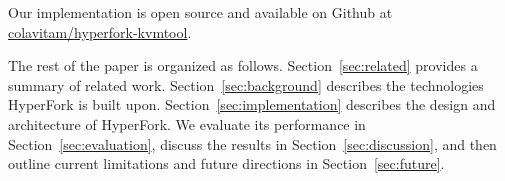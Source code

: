Our implementation is open source and available on Github at
\href{https://github.com/colavitam/hyperfork-kvmtool}{colavitam/hyperfork-kvmtool}.

The rest of the paper is organized as follows. Section~\ref{sec:related}
provides a summary of related work. Section~\ref{sec:background} describes the
technologies HyperFork is built upon. Section~\ref{sec:implementation}
describes the design and architecture of HyperFork. We evaluate its performance
in Section~\ref{sec:evaluation}, discuss the results in
Section~\ref{sec:discussion}, and then outline current limitations and future
directions in Section~\ref{sec:future}.
